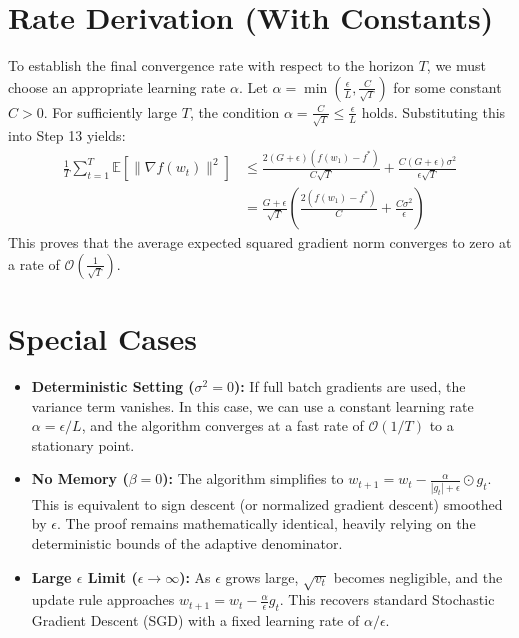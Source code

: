 \documentclass[11pt]{article}
\begin{document}
\section*{Rate Derivation (With Constants)}
To establish the final convergence rate with respect to the horizon $T$, we must choose an appropriate learning rate $\alpha$. 
Let $\alpha = \min\left(\frac{\epsilon}{L}, \frac{C}{\sqrt{T}}\right)$ for some constant $C > 0$. 
For sufficiently large $T$, the condition $\alpha = \frac{C}{\sqrt{T}} \leq \frac{\epsilon}{L}$ holds. Substituting this into Step 13 yields:
\begin{align}
    \frac{1}{T} \sum_{t=1}^T \mathbb{E}[\|\nabla f(w_t)\|^2] &\leq \frac{2(G + \epsilon)(f(w_1) - f^*)}{C \sqrt{T}} + \frac{C (G + \epsilon)\sigma^2}{\epsilon \sqrt{T}} \nonumber \\
    &= \frac{G + \epsilon}{\sqrt{T}} \left( \frac{2(f(w_1) - f^*)}{C} + \frac{C \sigma^2}{\epsilon} \right) \tag{Step 14}
\end{align}
This proves that the average expected squared gradient norm converges to zero at a rate of $\mathcal{O}\left(\frac{1}{\sqrt{T}}\right)$.

\section*{Special Cases}
\begin{itemize}
    \item \textbf{Deterministic Setting ($\sigma^2 = 0$):} If full batch gradients are used, the variance term vanishes. In this case, we can use a constant learning rate $\alpha = \epsilon/L$, and the algorithm converges at a fast rate of $\mathcal{O}(1/T)$ to a stationary point.
    \item \textbf{No Memory ($\beta = 0$):} The algorithm simplifies to $w_{t+1} = w_t - \frac{\alpha}{|g_t| + \epsilon} \odot g_t$. This is equivalent to sign descent (or normalized gradient descent) smoothed by $\epsilon$. The proof remains mathematically identical, heavily relying on the deterministic bounds of the adaptive denominator.
    \item \textbf{Large $\epsilon$ Limit ($\epsilon \to \infty$):} As $\epsilon$ grows large, $\sqrt{v_t}$ becomes negligible, and the update rule approaches $w_{t+1} = w_t - \frac{\alpha}{\epsilon} g_t$. This recovers standard Stochastic Gradient Descent (SGD) with a fixed learning rate of $\alpha/\epsilon$.
\end{itemize}
\end{document}
